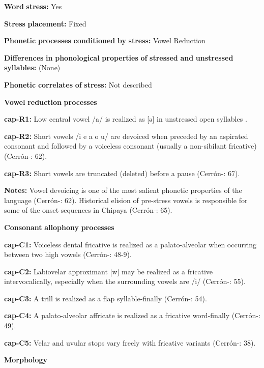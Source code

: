 \begin{styleBody}
\textbf{Word} \textbf{stress:} Yes

\textbf{Stress} \textbf{placement:} Fixed

\textbf{Phonetic} \textbf{processes} \textbf{conditioned} \textbf{by} \textbf{stress:} Vowel Reduction

\textbf{Differences} \textbf{in} \textbf{phonological} \textbf{properties} \textbf{of} \textbf{stressed} \textbf{and} \textbf{unstressed} \textbf{syllables:} (None)

\textbf{Phonetic} \textbf{correlates} \textbf{of} \textbf{stress:} Not described

\textbf{Vowel} \textbf{reduction} \textbf{processes}

\textbf{cap-R1:} Low central vowel /a/ is realized as [ə] in unstressed open syllables \citep[301]{Olson1967}.

\textbf{cap-R2:} Short vowels /i e a o u/ are devoiced when preceded by an aspirated consonant and followed by a voiceless consonant (usually a non-sibilant fricative) (Cerrón-\citealt{Palomino2006}: 62).

\textbf{cap-R3:} Short vowels are truncated (deleted) before a pause (Cerrón-\citealt{Palomino2006}: 67).

\textbf{Notes:} Vowel devoicing is one of the most salient phonetic properties of the language (Cerrón-\citealt{Palomino2006}: 62). Historical elision of pre-stress vowels is responsible for some of the onset sequences in Chipaya (Cerrón-\citealt{Palomino2006}: 65).

\textbf{Consonant} \textbf{allophony} \textbf{processes}

\textbf{cap-C1:} Voiceless dental fricative is realized as a palato-alveolar when occurring between two high vowels (Cerrón-\citealt{Palomino2006}: 48-9).

\textbf{cap-C2:} Labiovelar approximant [w] may be realized as a fricative intervocalically, especially when the surrounding vowels are /i/ (Cerrón-\citealt{Palomino2006}: 55).

\textbf{cap-C3:} A trill is realized as a flap syllable-finally (Cerrón-\citealt{Palomino2006}: 54).

\textbf{cap-C4:} A palato-alveolar affricate is realized as a fricative word-finally (Cerrón-\citealt{Palomino2006}: 49).

\textbf{cap-C5:} Velar and uvular stops vary freely with fricative variants (Cerrón-\citealt{Palomino2006}: 38).

\textbf{Morphology}


\end{styleBody}
